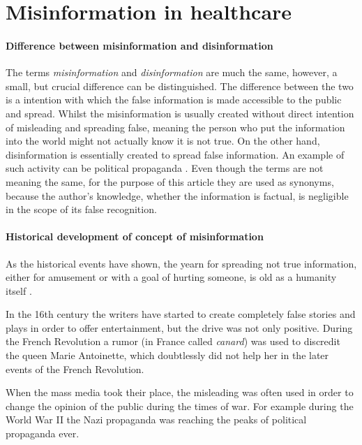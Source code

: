 \documentclass[11pt ,english,a4paper]{article}
\begin{document}
\section{Misinformation in healthcare}\label{mih}

\paragraph{Difference between misinformation and disinformation}
The terms \emph{misinformation} and \emph{disinformation} are much the same, however, a small, but crucial difference can be distinguished. The difference between the two is a intention with which the false information is made accessible to the public and spread. Whilst the misinformation is usually created without direct intention of misleading and spreading false, meaning the person who put the information into the world might not actually know it is not true. On the other hand, disinformation is essentially created to spread false information. An example of such activity can be political propaganda \cite{gu20misinfo} \cite{cook15misinfo}. Even though the terms are not meaning the same, for the purpose of this article they are used as synonyms, because the author's knowledge, whether the information is factual, is negligible in the scope of its false recognition.

\paragraph{Historical development of concept of misinformation}%
As the historical events have shown, the yearn for spreading not true information, either for amusement or with a goal of hurting someone, is old as a humanity itself \cite{bur17history}.

In the 16th century the writers have started to create completely false stories and plays in order to offer entertainment, but the drive was not only positive. During the French Revolution a rumor (in France called \emph{canard}) was used to discredit the queen Marie Antoinette, which doubtlessly did not help her in the later events of the French Revolution. \cite{bur17history} 

When the mass media took their place, the misleading was often used in order to change the opinion of the public during the times of war. For example during the World War II the Nazi propaganda was reaching the peaks of political propaganda ever. \cite{pos18short}
\end{document}
